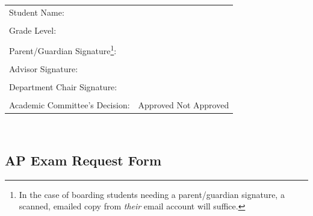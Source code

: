 \vfill
\noindent\hrulefill
\vspace{.5cm}

\renewcommand{\arraystretch}{1}
\noindent\begin{tabular}{ll}
Student Name: & \underline{\hspace{7cm}}\\
&\\
Grade Level:  & \underline{\hspace{7cm}}\\
&\\
Parent/Guardian Signature\footnote{In the case of boarding students needing a parent/guardian signature, a scanned, emailed copy from \emph{their} email account will suffice.}: & \underline{\hspace{7cm}}\\
&\\
Advisor Signature:  & \underline{\hspace{7cm}}\\
&\\
Department Chair Signature: &  \underline{\hspace{7cm}}\\
&\\
Academic Committee’s Decision:	& Approved  \hspace{.5cm} 	Not Approved
\end{tabular}\\







\newpage

\subsection{AP Exam Request Form}


